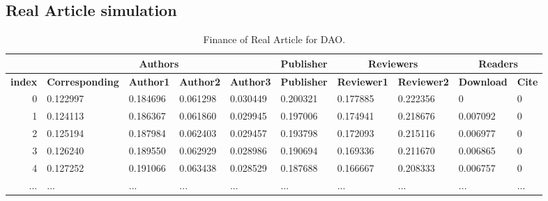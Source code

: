 \documentclass[lettersize,journal]{IEEEtran}
\begin{document}
\subsection{Real Article simulation}


\begin{table}[t!]
  \begin{center}
    \caption{Finance of Real Article for DAO.}
    \label{tab:realpaper}
    \begin{tabular}{r|l|l|l|l|l|l|l|l|l} %
                     & \multicolumn{4}{c|}{\textbf{Authors}} & \textbf{Publisher} & \multicolumn{2}{c|}{\textbf{Reviewers}} & \multicolumn{2}{c}{\textbf{Readers}}                                                                                                    \\
      \hline
      \textbf{index} & \textbf{Corresponding}                & \textbf{Author1}   & \textbf{Author2}                        & \textbf{Author3}                     & \textbf{Publisher} & \textbf{Reviewer1} & \textbf{Reviewer2} & \textbf{Download} & \textbf{Cite} \\
      \hline
      0              & 0.122997                              & 0.184696           & 0.061298                                & 0.030449                             & 0.200321           & 0.177885           & 0.222356           & 0                 & 0             \\
      1              & 0.124113                              & 0.186367           & 0.061860                                & 0.029945                             & 0.197006           & 0.174941           & 0.218676           & 0.007092          & 0             \\
      2              & 0.125194                              & 0.187984           & 0.062403                                & 0.029457                             & 0.193798           & 0.172093           & 0.215116           & 0.006977          & 0             \\
      3              & 0.126240                              & 0.189550           & 0.062929                                & 0.028986                             & 0.190694           & 0.169336           & 0.211670           & 0.006865          & 0             \\
      4              & 0.127252                              & 0.191066           & 0.063438                                & 0.028529                             & 0.187688           & 0.166667           & 0.208333           & 0.006757          & 0             \\
      ...            & ...                                   & ...                & ...                                     & ...                                  & ...                & ...                & ...                & ...               & ...           \\


\end{tabular}
\end{center}
\end{table}
\end{document}
